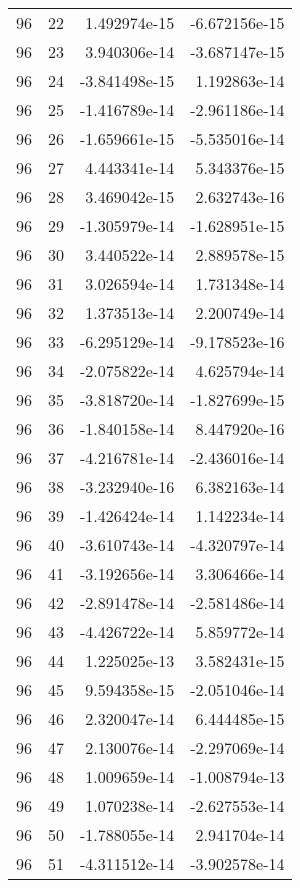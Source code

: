 \begin{tabular}{rrrr}
  96 &   22 &  1.492974e-15 & -6.672156e-15 \\
  96 &   23 &  3.940306e-14 & -3.687147e-15 \\
  96 &   24 & -3.841498e-15 &  1.192863e-14 \\
  96 &   25 & -1.416789e-14 & -2.961186e-14 \\
  96 &   26 & -1.659661e-15 & -5.535016e-14 \\
  96 &   27 &  4.443341e-14 &  5.343376e-15 \\
  96 &   28 &  3.469042e-15 &  2.632743e-16 \\
  96 &   29 & -1.305979e-14 & -1.628951e-15 \\
  96 &   30 &  3.440522e-14 &  2.889578e-15 \\
  96 &   31 &  3.026594e-14 &  1.731348e-14 \\
  96 &   32 &  1.373513e-14 &  2.200749e-14 \\
  96 &   33 & -6.295129e-14 & -9.178523e-16 \\
  96 &   34 & -2.075822e-14 &  4.625794e-14 \\
  96 &   35 & -3.818720e-14 & -1.827699e-15 \\
  96 &   36 & -1.840158e-14 &  8.447920e-16 \\
  96 &   37 & -4.216781e-14 & -2.436016e-14 \\
  96 &   38 & -3.232940e-16 &  6.382163e-14 \\
  96 &   39 & -1.426424e-14 &  1.142234e-14 \\
  96 &   40 & -3.610743e-14 & -4.320797e-14 \\
  96 &   41 & -3.192656e-14 &  3.306466e-14 \\
  96 &   42 & -2.891478e-14 & -2.581486e-14 \\
  96 &   43 & -4.426722e-14 &  5.859772e-14 \\
  96 &   44 &  1.225025e-13 &  3.582431e-15 \\
  96 &   45 &  9.594358e-15 & -2.051046e-14 \\
  96 &   46 &  2.320047e-14 &  6.444485e-15 \\
  96 &   47 &  2.130076e-14 & -2.297069e-14 \\
  96 &   48 &  1.009659e-14 & -1.008794e-13 \\
  96 &   49 &  1.070238e-14 & -2.627553e-14 \\
  96 &   50 & -1.788055e-14 &  2.941704e-14 \\
  96 &   51 & -4.311512e-14 & -3.902578e-14 \\

\end{tabular}
